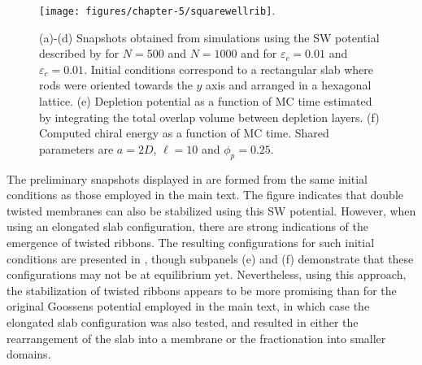 \begin{subappendices}
\begin{figure}
\begin{center}
\texttt{[image: figures/chapter-5/squarewellrib]}.
\caption[Snapshots obtained from simulations using the SW potential, rectangular initial conditions]{ \label{ribinitcond} (a)-(d) Snapshots obtained from simulations using the SW potential described by  for $N=500$ and $N=1000$ and for $\varepsilon_c=0.01$ and $\varepsilon_c=0.01$. Initial conditions correspond to a rectangular slab where rods were oriented towards the $y$ axis and arranged in a hexagonal lattice. (e) Depletion potential as a function of MC time estimated by integrating the total overlap volume between depletion layers. (f) Computed chiral energy as a function of MC time. Shared parameters are $a = 2D$, $\ell = 10$ and $\phi_p=0.25$.   }
\end{center}
\end{figure}

The preliminary snapshots displayed in  are formed from the same initial conditions as those employed in the main text. The figure indicates that double twisted membranes can also be stabilized using this SW potential. However, when using an elongated slab configuration, there are strong indications of the emergence of twisted ribbons. The resulting configurations for such initial conditions are presented in , though subpanels (e) and (f) demonstrate that these configurations may not be at equilibrium yet. Nevertheless, using this approach, the stabilization of twisted ribbons appears to be more promising than for the original Goossens potential employed in the main text, in which case the elongated slab configuration was also tested, and resulted in either the rearrangement of the slab into a membrane or the fractionation into smaller domains.



\end{subappendices}




\clearpage









